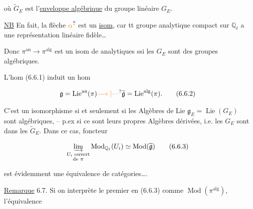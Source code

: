 où $\widetilde G_E$ est l'\uline{enveloppe algébrique} du groupe linéaire $G_E$.

\uline{NB} En fait, la flèche $\unsure{\alpha}$ est un \uline{isom}, car tt groupe analytique compact sur $\mathbb Q_\ell$ a une représentation linéaire fidèle\ldots
{}

Donc $\pi^{\mathrm{an}}\longrightarrow\pi^{\mathrm{alg}}$ est un isom de  analytiques ssi  les $G_E$ sont  des groupes  algébriques. 


L'hom (6.6.1) induit un hom

\[
\mathfrak g=\operatorname{Lie}^{\mathrm{an}}(\pi)\unsure{\longrightarrow|\text{---}}\widetilde{\mathfrak g}=\operatorname{Lie}^{\mathrm{alg}}(\pi).
\tag*{(6.6.2)}
\]

C'est un isomorphisme si et seulement si les Algèbres de Lie $\mathfrak g_E=\operatorname{Lie}(G_E)$ sont algébriques, -- p.ex si ce sont leurs propres Algèbres dérivées, i.e. les $G_E$ sont  dans les $\widetilde G_E$. Dans ce cas,  foncteur

\[
\varinjlim_{\substack{U_i\text{ ouvert}\\\text{de }\pi}}\operatorname{Mod}_{\mathbb Q_\ell}(U_i)\simeq\operatorname{Mod}(\widetilde{\mathfrak g})
\tag*{(6.6.3)}
\]

est évidemment une équivalence de catégories\ldots.


\uline{Remarque} 6.7. Si on interprète le premier  en (6.6.3) comme $\operatorname{Mod}(\pi^{\mathrm{alg}})$, l'équivalence

